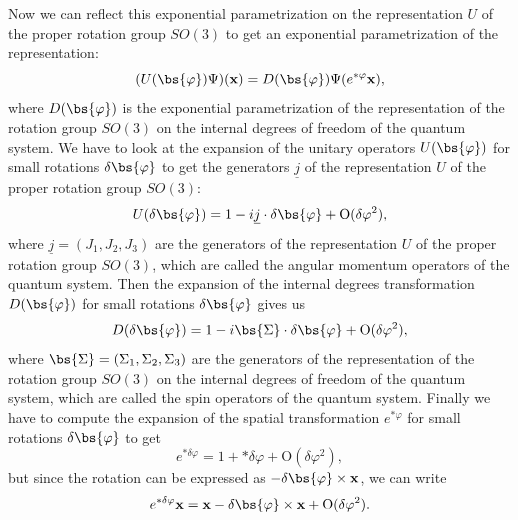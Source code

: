 \begin{example}
    Now we can reflect this exponential parametrization on the representation \(U\) of the proper rotation group \(SO(3)\) to get an exponential parametrization of the representation:
    \[
        (U(\bs{\varphi})\Psi)(\mathbf{x}) = D(\bs{\varphi})\Psi(e^{* \varphi}\mathbf{x}),
    \]
    where \(D(\bs{\varphi})\) is the exponential parametrization of the representation of the rotation group \(SO(3)\) on the internal degrees of freedom of the quantum system. We have to look at the expansion of the unitary operators \(U(\bs{\varphi})\) for small rotations \(\delta \bs{\varphi}\) to get the generators \(\underline{j}\) of the representation \(U\) of the proper rotation group \(SO(3)\):
    \[
        U(\delta \bs{\varphi}) = 1 - i \underline{j} \cdot \delta \bs{\varphi} + \mathrm{O}(\delta \varphi^2),
    \]
    where \(\underline{j} = (J_1, J_2, J_3)\) are the generators of the representation \(U\) of the proper rotation group \(SO(3)\), which are called the angular momentum operators of the quantum system. Then the expansion of the internal degrees transformation \(D(\bs{\varphi})\) for small rotations \(\delta \bs{\varphi}\) gives us
    \[
        D(\delta \bs{\varphi}) = 1 - i \bs{\Sigma} \cdot \delta \bs{\varphi} + \mathrm{O}(\delta \varphi^2),
    \]
    where \(\bs{\Sigma} = (\Sigma_1, \Sigma_2, \Sigma_3)\) are the generators of the representation of the rotation group \(SO(3)\) on the internal degrees of freedom of the quantum system, which are called the spin operators of the quantum system. Finally we have to compute the expansion of the spatial transformation \(e^{* \varphi}\) for small rotations \(\delta \bs{\varphi}\) to get
    \[
        e^{* \delta \varphi} = 1 + *\delta \varphi + \mathrm{O}(\delta \varphi^2),
    \]
    but since the rotation can be expressed as \(- \delta \bs{\varphi} \times \mathbf{x}\), we can write
    \[
        e^{* \delta \varphi} \mathbf{x} = \mathbf{x} - \delta \bs{\varphi} \times \mathbf{x} + \mathrm{O}(\delta \varphi^2).
    \]


\end{example}
